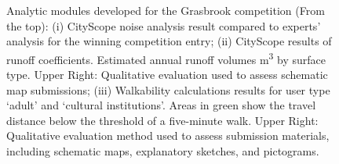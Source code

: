 {{\begin{figure}[!h]
\begin{center}
            \end{center}
            \caption{
                Analytic modules developed for the Grasbrook competition (From the top):
                (i) CityScope noise analysis result compared to experts' analysis for the winning competition entry; (ii) CityScope results of runoff coefficients. Estimated annual runoff volumes m\textsuperscript{3} by surface type. Upper Right: Qualitative evaluation used to assess schematic map submissions; (iii) Walkability calculations results for user type `adult' and `cultural institutions'. Areas in green show the travel distance below the threshold of a five-minute walk. Upper Right: Qualitative evaluation method used to assess submission materials, including schematic maps, explanatory sketches, and pictograms.
            }
            \label{fig:grasbrook_results}
        \end{figure}

}}
